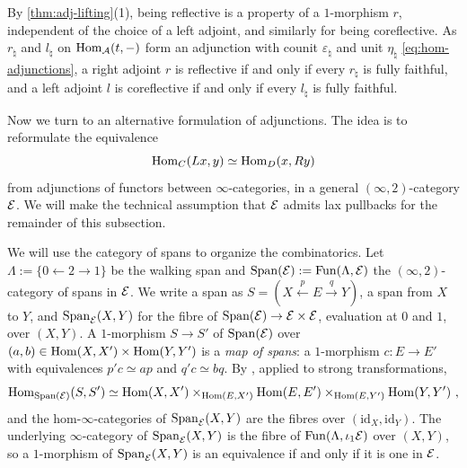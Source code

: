 %
By \cref{thm:adj-lifting}(1),
being reflective is a property of a $1$-morphism $r$,
independent of the choice of a left adjoint,
and similarly for being coreflective.
As $r_{\natural}$ and $l_{\natural}$ on $\operatorname{Hom}_{\mathcal{A}}(t,-)$ form an adjunction with
counit
$\varepsilon_{\natural}$
and unit $\eta_{\natural}$ \eqref{eq:hom-adjunctions},
a right adjoint $r$ is reflective if and only if every $r_{\natural}$ is fully
faithful, and a left adjoint $l$ is coreflective if and only if every
$l_{\natural}$ is fully faithful.

%
Now we turn to an alternative formulation of adjunctions.
The idea is to reformulate the equivalence
\begin{equation*}
\operatorname{Hom} _{C} (Lx, y) \simeq \operatorname{Hom} _{D} (x, Ry)
\end{equation*}
from adjunctions of functors between $ \infty $-categories,
in a general $ (\infty, 2) $-category $ \mathcal{E} $.
We will make the technical assumption that $ \mathcal{E} $ admits lax pullbacks
for the remainder of this subsection.

%
We will use the category of spans to organize the combinatorics.
Let
$\Lambda := \{0 \leftarrow 2 \rightarrow 1\}$
be the walking span and
$\mathrm{Span}(\mathcal{E}) := \operatorname{Fun}(\Lambda,\mathcal{E})$
the $(\infty,2)$-category of spans in $\mathcal{E}$. We write a span as
$S = (X \xleftarrow{p} E \xrightarrow{q} Y)$,
a span from $X$ to $Y$, and $\mathrm{Span}_{\mathcal{E}}(X,Y)$ for the fibre of
$\mathrm{Span}(\mathcal{E}) \to \mathcal{E} \times \mathcal{E}$,
evaluation at $0$ and $1$, over $(X,Y)$.
A $1$-morphism $S \to S'$ of $\mathrm{Span}(\mathcal{E})$ over
$(a,b) \in \operatorname{Hom}(X,X') \times \operatorname{Hom}(Y,Y')$
is a \emph{map of spans}: a $1$-morphism $c\colon E \to E'$ with equivalences
$p'c \simeq ap$ and $q'c \simeq bq$. By
\cite[Prop.~4.1.2]{abellangagnahaugseng2024straightening},
applied to strong transformations,
\begin{equation*}
\operatorname{Hom}_{\mathrm{Span}(\mathcal{E})}(S,S') \simeq \operatorname{Hom}(X,X') \times_{\operatorname{Hom}(E,X')} \operatorname{Hom}(E,E')
\times_{\operatorname{Hom}(E,Y')} \operatorname{Hom}(Y,Y') \ ,
\end{equation*}
and the hom-$\infty$-categories of $\mathrm{Span}_{\mathcal{E}}(X,Y)$ are the fibres over
$(\mathrm{id}_{X},\mathrm{id}_{Y})$.
The underlying $\infty$-category of $\mathrm{Span}_{\mathcal{E}}(X,Y)$ is the fibre of
$\operatorname{Fun}(\Lambda,\iota_{1}\mathcal{E})$
over $(X,Y)$, so a $1$-morphism of $\mathrm{Span}_{\mathcal{E}}(X,Y)$ is an equivalence if and
only if it is one in $\mathcal{E}$.

